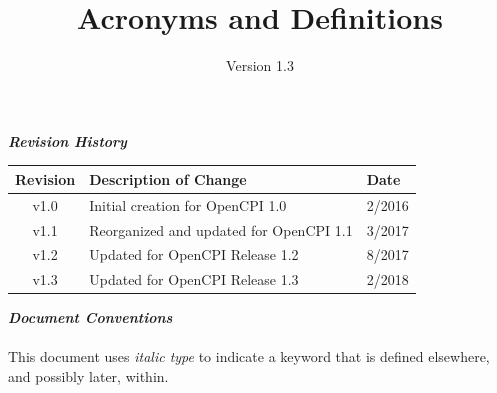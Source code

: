 \def\docTitle{Acronyms and Definitions}
\def\docVersion{1.3}

\date{Version \docVersion} %
\title{\docTitle}
\lhead{\small{\docTitle}}
\usepackage{enumitem}

\maketitle
\thispagestyle{fancy}
\newpage
\begin{center}
  \textit{\textbf{Revision History}}
  \begin{table}[H]
    \begin{tabularx}{\textwidth}{|c|X|l|}
      \hline
      \rowcolor{blue}
      \textbf{Revision} & \textbf{Description of Change} & \textbf{Date} \\
      \hline
      v1.0 & Initial creation for OpenCPI 1.0 & 2/2016 \\
      \hline
      v1.1 & Reorganized and updated for OpenCPI 1.1 & 3/2017 \\
      \hline
      v1.2 & Updated for OpenCPI Release 1.2 & 8/2017 \\
      \hline
      v1.3 & Updated for OpenCPI Release 1.3 & 2/2018 \\
      \hline
    \end{tabularx}
  \end{table}
  \par
  \textit{\textbf{Document Conventions}}\\
  ~\\
  This document uses \textit{italic type} to indicate a keyword that is defined elsewhere, and possibly later, within.
\end{center}
\newpage
